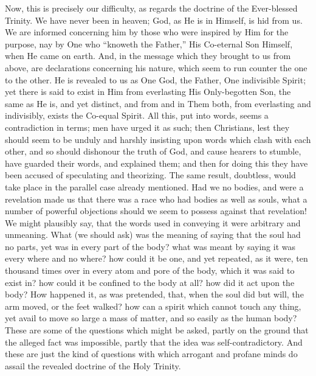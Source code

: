 Now, this is precisely our difficulty, as regards the doctrine of
the Ever-blessed Trinity. We have never been in heaven; God, as He is
in Himself, is hid from us. We are informed concerning him by those
who were inspired by Him for the purpose, nay by One who ``knoweth
the Father,'' His Co-eternal Son Himself, when He came on earth.
And, in the message which they brought to us from above, are
declarations concerning his nature, which seem to run counter the one
to the other. He is revealed to us as One God, the Father, One
indivisible Spirit; yet there is said to exist in Him from everlasting
His Only-begotten Son, the same as He is, and yet distinct, and from
and in Them both, from everlasting and indivisibly, exists the
Co-equal Spirit. All this, put into words, seems a contradiction in
terms; men have urged it as such; then Christians, lest they should
seem to be unduly and harshly insisting upon words which clash with
each other, and so should dishonour the truth of God, and cause
hearers to stumble, have guarded their words, and explained them; and
then for doing this they have been accused of speculating and
theorizing. The same result, doubtless, would take place in the
parallel case already mentioned. Had we no bodies, and were a
revelation made us that there was a race who had bodies as well as
souls, what a number of powerful objections should we seem to possess
against that revelation! We might plausibly say, that the words used
in conveying it were arbitrary and unmeaning. What (we should ask) was
the meaning of saying that the soul had no parts, yet was in every
part of the body? what was meant by saying it was every where and no
where? how could it be one, and yet repeated, as it were, ten thousand
times over in every atom and pore of the body, which it was said to
exist in? how could it be confined to the body at all? how did it act
upon the body? How happened it, as was pretended, that, when the soul
did but will, the arm moved, or the feet walked? how can a spirit
which cannot touch any thing, yet avail to move so large a mass of
matter, and so easily as the human body? These are some of the
questions which might be asked, partly on the ground that the alleged
fact was impossible, partly that the idea was self-contradictory. And
these are just the kind of questions with which arrogant and profane
minds do assail the revealed doctrine of the Holy Trinity.

